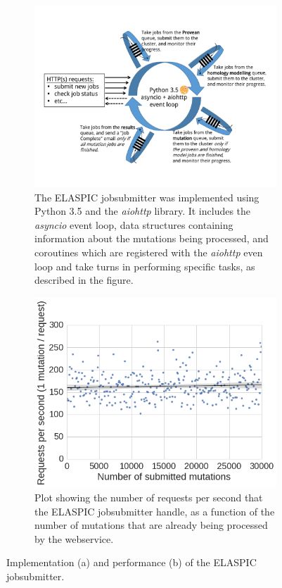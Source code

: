 \begin{figure}[!htb]
	\centering

	\begin{subfigure}{0.8\textwidth}
		\centering
		\includegraphics[width=1\linewidth]{static/elaspic/elaspic_jobsubmitter.pdf}
		\caption{
		The ELASPIC jobsubmitter was implemented using Python 3.5 and the \textit{aiohttp} library.
		It includes the \textit{asyncio} event loop, data structures containing information about the mutations being processed, and coroutines which are registered with the \textit{aiohttp} even loop and take turns in performing specific tasks, as described in the figure.
		}
		\label{fig:elaspic_jobsubmitter}
	\end{subfigure}
	\vspace*{10mm}

	\begin{subfigure}[t]{0.8\textwidth}
		\centering
		\includegraphics[width=0.7\linewidth]{static/elaspic/elaspic_jobsubmitter_performance.png}
		\caption{Plot showing the number of requests per second that the ELASPIC jobsubmitter handle, as a function of the number of mutations that are already being processed by the webservice.}
		\label{fig:elaspic_jobsubmitter_performance}
	\end{subfigure}
	\vspace*{5mm}

	\caption[ELASPIC jobsubmitter.]{
	Implementation (a) and performance (b) of the ELASPIC jobsubmitter.
	}
	\label{fig:ELASPIC jobsubmitter}

\end{figure}
